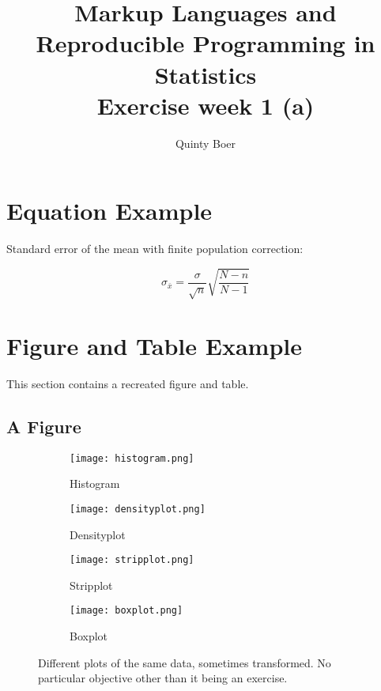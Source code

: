 \documentclass[10pt, a4paper, titlepage]{article}
\title{Markup Languages and Reproducible Programming in Statistics \\ \small Exercise week 1 (a)}
\author{Quinty Boer}
\date{}
\begin{document}
\maketitle
\newpage

\section{Equation Example}

Standard error of the mean with finite population correction:

\begin{equation}
    \sigma_{\bar{x}} = \frac{\sigma}{\sqrt{n}} \sqrt{\frac{N-n}{N-1}}
\end{equation}

\section{Figure and Table Example}

This section contains a recreated figure and table.

\subsection{A Figure}

\begin{figure}[H]
\centering
\begin{subfigure}[b]{0.45\textwidth}
    \centering
    \texttt{[image: histogram.png]}
    \caption{Histogram}
    \label{fig:histogram}
\end{subfigure}
\hfill
\begin{subfigure}[b]{0.45\textwidth}
    \centering
    \texttt{[image: densityplot.png]}
    \caption{Densityplot}
    \label{fig:densityplot}
\end{subfigure}
\vspace{0.5cm}
\begin{subfigure}[b]{0.45\textwidth}
    \centering
    \texttt{[image: stripplot.png]}
    \caption{Stripplot}
    \label{fig:stripplot}
\end{subfigure}
\hfill
\begin{subfigure}[b]{0.45\textwidth}
    \centering
    \texttt{[image: boxplot.png]}
    \caption{Boxplot}
    \label{fig:boxplot}
\end{subfigure}
\caption{Different plots of the same data, sometimes transformed. No particular objective other than it being an exercise.}
\label{fig:plots}
\end{figure}
\end{document}
